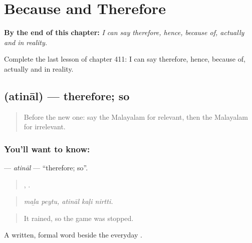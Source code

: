 
\chapter{Because and Therefore}
\label{ch:ml-because-and-therefore}

\begin{chapteropening}
\textbf{By the end of this chapter:} \emph{I can say therefore, hence, because of, actually and in reality.}

Complete the last lesson of chapter 411: I can say therefore, hence, because of, actually and in reality.
\end{chapteropening}

\section[\texorpdfstring{\ml{അതിനാൽ} (atināl)}{അതിനാൽ (atināl)}]{ (atināl) — therefore; so}

\label{lesson:ML-C411-atinal}



\begin{quote}
Before the new one: say the Malayalam for relevant, then the Malayalam for irrelevant.
\end{quote}

\subsection*{You'll want to know: }
\textbf{} — \emph{atināl} — \textquotedblleft{}therefore; so\textquotedblright{}.

\begin{quote}
 ,   .
\end{quote}

\begin{quote}
\emph{maḻa peytu, atināl kaḷi nirtti.}
\end{quote}

\begin{quote}
It rained, so the game was stopped.
\end{quote}

A written, formal word beside the everyday .

